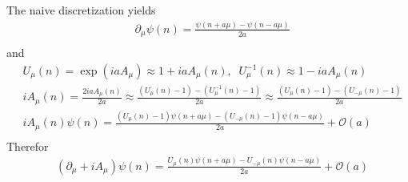 The naive discretization yields
\begin{equation}
\begin{split}
&\partial _{\mu}\psi(n) =\frac{\psi (n+a\mu)-\psi (n-a\mu)}{2a}\\
\end{split}
\end{equation}
and
\begin{equation}
\begin{split}
&U_{\mu}(n)=\exp(iaA_{\mu})\approx 1+iaA_{\mu}(n),\;\;U^{-1}_{\mu}(n)\approx 1-iaA_{\mu}(n)\\
&iA_{\mu}(n)=\frac{2iaA_{\mu}(n)}{2a}\approx \frac{(U_{\mu}(n)-1)-(U^{-1}_{\mu}(n)-1)}{2a}\approx \frac{(U_{\mu}(n)-1)-(U_{-\mu}(n)-1)}{2a}\\
&iA_{\mu}(n)\psi(n)= \frac{(U_{\mu}(n)-1)\psi(n+a\mu)-(U_{-\mu}(n)-1)\psi(n-a\mu)}{2a}+\mathcal{O}(a)\\
\end{split}
\end{equation}
Therefor
\begin{equation}
\begin{split}
&(\partial _{\mu}+iA_{\mu})\psi(n)= \frac{U_{\mu}(n)\psi(n+a\mu)-U_{-\mu}(n)\psi(n-a\mu)}{2a}+\mathcal{O}(a)\\
\end{split}
\end{equation}

